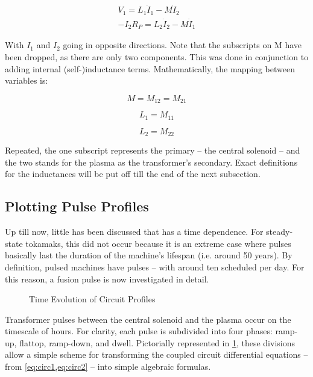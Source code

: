 \begin{align}
	\label{eq:circ1}
	V_1 = L_1 \dot I_1 - M \dot I_2 \\
	\label{eq:circ2}
	-I_2 R_P = L_2 \dot I_2 - M \dot I_1
\end{align}

With $I_1$ and $I_2$ going in opposite directions. Note that the subscripts on M have been dropped, as there are only two components. This was done in conjunction to adding internal (self-)inductance terms. Mathematically, the mapping between variables is:

\begin{equation}
	M = M_{12} = M_{21}
\end{equation}

\begin{equation}
	L_1 = M_{11}\end{equation}

\begin{equation}
	L_2 = M_{22}
\end{equation}

Repeated, the one subscript represents the primary -- the central solenoid -- and the two stands for the plasma as the transformer's secondary. Exact definitions for the inductances will be put off till the end of the next subsection.

\subsection{Plotting Pulse Profiles}

Up till now, little has been discussed that has a time dependence. For steady-state tokamaks, this did not occur because it is an extreme case where pulses basically last the duration of the machine's lifespan (i.e. around 50 years). By definition, pulsed machines have pulses -- with around ten scheduled per day. For this reason, a fusion pulse is now investigated in detail.

\begin{figure}[h!]
\centering

\caption{Time Evolution of Circuit Profiles}
\label{fig:circuit_profiles}
\end{figure}

Transformer pulses between the central solenoid and the plasma occur on the timescale of hours. For clarity, each pulse is subdivided into four phases: ramp-up, flattop, ramp-down, and dwell. Pictorially represented in \cref{fig:circuit_profiles}, these divisions allow a simple scheme for transforming the coupled circuit differential equations -- from \cref{eq:circ1,eq:circ2} -- into simple algebraic formulas. 

